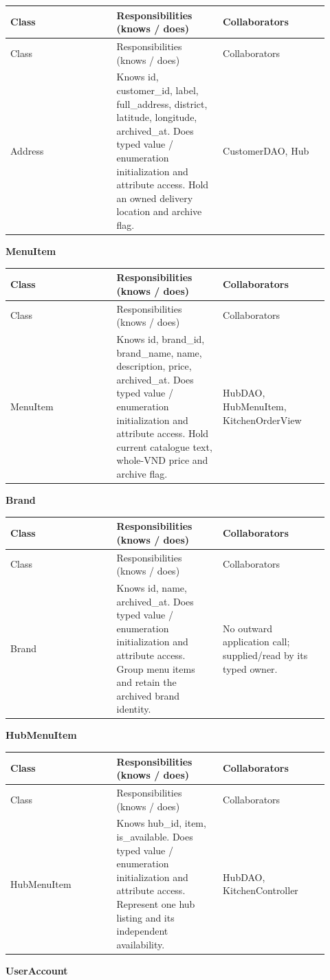 \begin{longtable}{>{\raggedright\arraybackslash}p{0.3067\linewidth}>{\raggedright\arraybackslash}p{0.3067\linewidth}>{\raggedright\arraybackslash}p{0.3067\linewidth}}
Class & Responsibilities (knows / does) & Collaborators \\
\hline\endfirsthead
Class & Responsibilities (knows / does) & Collaborators \\
\hline\endhead
Address & Knows id, customer\_id, label, full\_address, district, latitude, longitude, archived\_at. Does typed value / enumeration initialization and attribute access. Hold an owned delivery location and archive flag. & CustomerDAO, Hub \\
\end{longtable}
\textbf{MenuItem}

\begin{longtable}{>{\raggedright\arraybackslash}p{0.3067\linewidth}>{\raggedright\arraybackslash}p{0.3067\linewidth}>{\raggedright\arraybackslash}p{0.3067\linewidth}}
Class & Responsibilities (knows / does) & Collaborators \\
\hline\endfirsthead
Class & Responsibilities (knows / does) & Collaborators \\
\hline\endhead
MenuItem & Knows id, brand\_id, brand\_name, name, description, price, archived\_at. Does typed value / enumeration initialization and attribute access. Hold current catalogue text, whole-VND price and archive flag. & HubDAO, HubMenuItem, KitchenOrderView \\
\end{longtable}
\textbf{Brand}

\begin{longtable}{>{\raggedright\arraybackslash}p{0.3067\linewidth}>{\raggedright\arraybackslash}p{0.3067\linewidth}>{\raggedright\arraybackslash}p{0.3067\linewidth}}
Class & Responsibilities (knows / does) & Collaborators \\
\hline\endfirsthead
Class & Responsibilities (knows / does) & Collaborators \\
\hline\endhead
Brand & Knows id, name, archived\_at. Does typed value / enumeration initialization and attribute access. Group menu items and retain the archived brand identity. & No outward application call; supplied/read by its typed owner. \\
\end{longtable}
\textbf{HubMenuItem}

\begin{longtable}{>{\raggedright\arraybackslash}p{0.3067\linewidth}>{\raggedright\arraybackslash}p{0.3067\linewidth}>{\raggedright\arraybackslash}p{0.3067\linewidth}}
Class & Responsibilities (knows / does) & Collaborators \\
\hline\endfirsthead
Class & Responsibilities (knows / does) & Collaborators \\
\hline\endhead
HubMenuItem & Knows hub\_id, item, is\_available. Does typed value / enumeration initialization and attribute access. Represent one hub listing and its independent availability. & HubDAO, KitchenController \\
\end{longtable}
\textbf{UserAccount}

